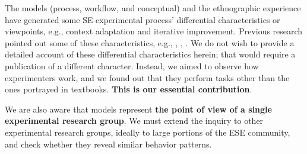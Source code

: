 The models (process, workflow, and conceptual) and the ethnographic experience have generated some SE experimental process' differential characteristics or viewpoints, e.g., context adaptation and iterative improvement. Previous research pointed out some of these characteristics, e.g., \cite{Mohamed-1993-roles-ESE}, \cite{Sjoberg-2005-survey-experiments-SE}, \cite{Shull-2004-Knowledge-sharing-issues-SE}. We do not wish to provide a detailed account of these differential characteristics herein; that would require a publication of a different character. Instead, we aimed to observe how experimenters work, and we found out that they perform tasks other than the ones portrayed in textbooks. \textbf{This is our essential contribution}.

We are also aware that models represent \textbf{the point of view of a single experimental research group}. We must extend the inquiry to other experimental research groups, ideally to large portions of the ESE community, and check whether they reveal similar behavior patterns.